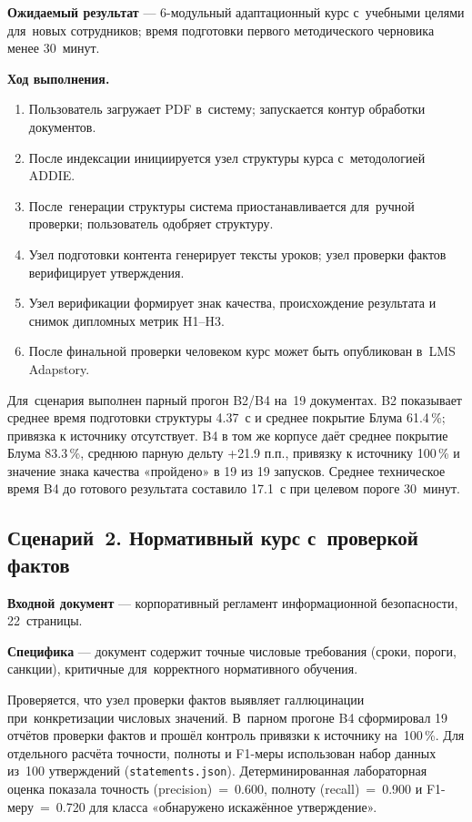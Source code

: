 \textbf{Ожидаемый результат} — 6-модульный адаптационный курс с~учебными
целями для~новых сотрудников; время подготовки первого методического
черновика менее 30~минут.

\textbf{Ход выполнения.}
\begin{enumerate}
  \item Пользователь загружает PDF в~систему; запускается контур обработки документов.
  \item После индексации инициируется узел структуры курса
    с~методологией ADDIE.
  \item После~генерации структуры система приостанавливается для~ручной проверки;
    пользователь одобряет структуру.
  \item Узел подготовки контента генерирует тексты уроков; узел проверки фактов
    верифицирует утверждения.
  \item Узел верификации формирует знак качества, происхождение результата и снимок
    дипломных метрик H1–H3.
  \item После финальной проверки человеком курс может быть опубликован
    в~LMS Adapstory.
\end{enumerate}

Для~сценария выполнен парный прогон B2/B4 на~19 документах. B2 показывает
среднее время подготовки структуры 4.37~с и среднее покрытие Блума
61.4\,\%; привязка к источнику отсутствует. B4 в том же корпусе даёт
среднее покрытие Блума 83.3\,\%, среднюю парную дельту +21.9 п.п.,
привязку к источнику 100\,\% и значение знака качества «пройдено» в 19 из 19
запусков. Среднее техническое время B4 до готового результата
составило 17.1~с при целевом пороге 30~минут.

\subsection{Сценарий~2. Нормативный курс с~проверкой фактов}

\textbf{Входной документ} — корпоративный регламент информационной
безопасности, 22~страницы.

\textbf{Специфика} — документ содержит точные числовые требования
(сроки, пороги, санкции), критичные для~корректного нормативного обучения.

Проверяется, что узел проверки фактов выявляет галлюцинации при~конкретизации
числовых значений. В~парном прогоне B4 сформировал 19 отчётов проверки фактов
и прошёл контроль привязки к источнику на~100\,\%. Для отдельного расчёта
точности, полноты и F1-меры использован набор данных из~100 утверждений
(\texttt{statements.json}). Детерминированная лабораторная оценка показала
точность (precision)~=~0.600, полноту (recall)~=~0.900 и F1-меру~=~0.720 для класса
«обнаружено искажённое утверждение».

